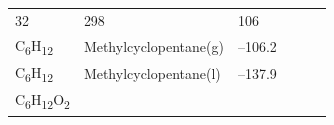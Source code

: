 \documentclass[
  9pt,
]{extbook}
\theoremstyle{definition}
\theoremstyle{definition}
\theoremstyle{definition}
\theoremstyle{remark}
\begin{document}
\begin{longtable}[]{@{}llllll@{}}
\begin{minipage}[t]{0.15\columnwidth}
32\strut
\end{minipage} & \begin{minipage}[t]{0.14\columnwidth}\raggedright
298\strut
\end{minipage} & \begin{minipage}[t]{0.14\columnwidth}\raggedright
106\strut
\end{minipage}\tabularnewline
\begin{minipage}[t]{0.07\columnwidth}\raggedright
C\textsubscript{6}H\textsubscript{12}\strut
\end{minipage} & \begin{minipage}[t]{0.17\columnwidth}\raggedright
Methylcyclopentane(g)\strut
\end{minipage} & \begin{minipage}[t]{0.15\columnwidth}\raggedright
--106.2\strut
\end{minipage} & \begin{minipage}[t]{0.15\columnwidth}\raggedright
\strut
\end{minipage} & \begin{minipage}[t]{0.14\columnwidth}\raggedright
\strut
\end{minipage} & \begin{minipage}[t]{0.14\columnwidth}\raggedright
\strut
\end{minipage}\tabularnewline
\begin{minipage}[t]{0.07\columnwidth}\raggedright
C\textsubscript{6}H\textsubscript{12}\strut
\end{minipage} & \begin{minipage}[t]{0.17\columnwidth}\raggedright
Methylcyclopentane(l)\strut
\end{minipage} & \begin{minipage}[t]{0.15\columnwidth}\raggedright
--137.9\strut
\end{minipage} & \begin{minipage}[t]{0.15\columnwidth}\raggedright
\strut
\end{minipage} & \begin{minipage}[t]{0.14\columnwidth}\raggedright
\strut
\end{minipage} & \begin{minipage}[t]{0.14\columnwidth}\raggedright
\strut
\end{minipage}\tabularnewline
\begin{minipage}[t]{0.07\columnwidth}\raggedright
C\textsubscript{6}H\textsubscript{12}O\textsubscript{2}\strut
\end{minipage} & \begin{minipage}[t]{0.17\columnwidth}\raggedright

\end{minipage}
\end{longtable}
\end{document}
